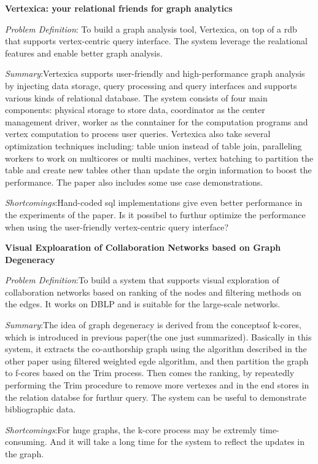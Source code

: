 \textbf{Vertexica: your relational friends for graph analytics}
\cite{vertexica}
\begin{itemize*}
\item {\em Problem Definition}: To build a graph analysis tool, Vertexica, on top of a rdb that supports vertex-centric query interface. The system leverage the realational features and enable better graph analysis.
\item {\em Summary}:Vertexica supports user-friendly and high-performance graph analysis by injecting data storage, query processing and query interfaces and supports various kinds of relational database. The system consists of four main components: physical storage to store data, coordinator as the center management driver, worker as the conntainer for the computation programs and vertex computation to process user queries. Vertexica also take several optimization techniques including: table union instead of table join, paralleling workers to work on multicores or multi machines, vertex batching to partition the table and create new tables other than update the orgin information to boost the performance. The paper also includes some use case demonstrations. 
\item {\em Shortcomings}:Hand-coded sql implementations give even better performance in the experiments of the paper. Is it possibel to furthur optimize the performance when using the user-friendly vertex-centric query interface?
\end{itemize*}

\textbf{Visual Exploaration of Collaboration Networks based on Graph Degeneracy}
\cite{visual}
\begin{itemize*}
\item {\em Problem Definition}:To build a system that supports visual exploration of collaboration networks based on ranking of the nodes and filtering methods on the edges. It works on DBLP and is suitable for the large-scale networks.
\item {\em Summary}:The idea of graph degeneracy is derived from the conceptsof k-cores, which is introduced in previous paper(the one just summarized). Basically in this system, it extracts the co-authorship graph using the algorithm described in the other paper using filtered weighted egde algorithm, and then partition the graph to f-cores based on the Trim process. Then comes the ranking, by repeatedly performing the Trim procedure to remove more vertexes and in the end stores in the relation databse for furthur query. The system can be useful to demonstrate bibliographic data.
\item {\em Shortcomings}:For huge graphs, the k-core process may be extremly time-consuming. And it will take a long time for the system to reflect the updates in the graph.
\end{itemize*}


